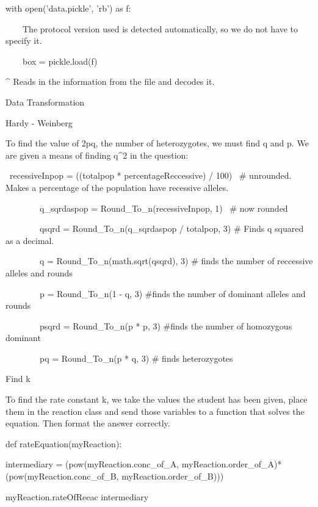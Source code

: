 \documentclass{article}
\begin{document}
\bigskip


\bigskip

with open('data.pickle', 'rb') as f:

\ \ \ \ The protocol version used is detected automatically, so we do not have to specify it.

\ \ \ \ box = pickle.load(f)


\bigskip

\^{} Reads in the information from the file and decodes it.


\bigskip


\bigskip

Data Transformation


\bigskip


\bigskip

Hardy - Weinberg

To find the value of 2pq, the number of heterozygotes, we must find q and p. We are given a means of finding q\^{}2 in the question:

\ recessiveInpop = ((totalpop * percentageReccessive) / 100) \ \# unrounded. Makes a percentage of the population have recessive alleles.

\ \ \ \ \ \ \ \ q\_sqrdaspop = Round\_To\_n(recessiveInpop, 1) \ \# now rounded

\ \ \ \ \ \ \ \ qsqrd = Round\_To\_n(q\_sqrdaspop / totalpop, 3) \# Finds q squared as a decimal.

\ \ \ \ \ \ \ \ q = Round\_To\_n(math.sqrt(qsqrd), 3) \# finds the number of reccessive alleles and rounds

\ \ \ \ \ \ \ \ p = Round\_To\_n(1 - q, 3) \#finds the number of dominant alleles and rounds

\ \ \ \ \ \ \ \ psqrd = Round\_To\_n(p * p, 3) \#finds the number of homozygous dominant

\ \ \ \ \ \ \ \ pq = Round\_To\_n(p * q, 3) \# finds heterozygotes

Find k

To find the rate constant k, we take the values the student has been given, place them in the reaction class and send those variables to a function that solves the equation. Then format the answer correctly.


\bigskip

def rateEquation(myReaction):

intermediary = (pow(myReaction.conc\_of\_A, myReaction.order\_of\_A)* (pow(myReaction.conc\_of\_B, myReaction.order\_of\_B)))

myReaction.rateOfReeac intermediary
\end{document}
